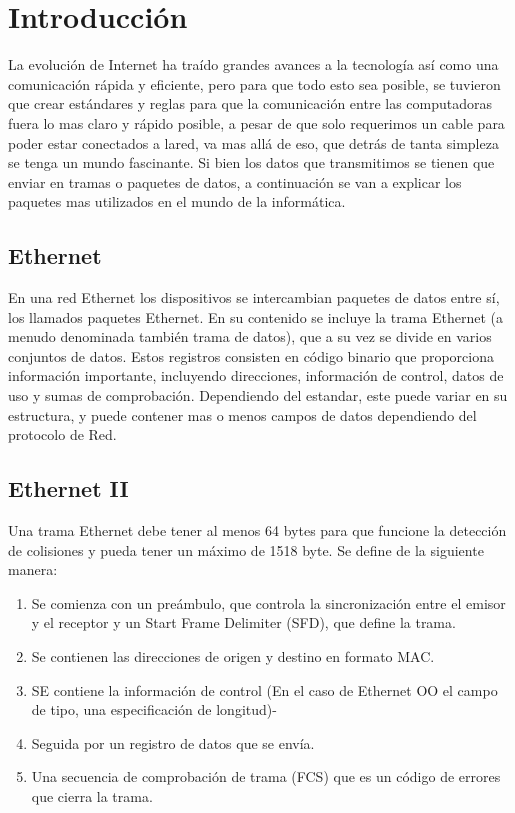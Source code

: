 \documentclass[12pt]{report}
\begin{document}
	\section*{Introducción}
	
	La evolución de Internet ha traído grandes avances a la tecnología así como una comunicación rápida y eficiente, pero para que todo esto sea posible, se tuvieron que crear estándares y reglas para que la comunicación entre las computadoras fuera lo mas claro y rápido posible, a pesar de que solo requerimos un cable para poder estar conectados a lared, va mas allá de eso, que detrás de tanta simpleza se tenga un mundo fascinante. Si bien los datos que transmitimos se tienen que enviar en tramas o paquetes de datos, a continuación se van a explicar los paquetes mas utilizados en el mundo de la informática.
	
	\subsection*{Ethernet}
	En una red Ethernet los dispositivos se intercambian paquetes de datos entre sí, los llamados paquetes Ethernet. En su contenido se incluye la trama Ethernet (a menudo denominada también trama de datos), que a su vez se divide en varios conjuntos de datos. Estos registros consisten en código binario que proporciona información importante, incluyendo direcciones, información de control, datos de uso y sumas de comprobación. Dependiendo del estandar, este puede variar en su estructura, y puede contener mas o menos campos de datos dependiendo del protocolo de Red.
	
	\subsection*{Ethernet II}
	
	Una trama Ethernet debe tener al menos 64 bytes para que funcione la detección de colisiones y pueda tener un máximo de 1518 byte. Se define de la siguiente manera:
	
	\begin{enumerate}
		\item Se comienza con un preámbulo, que controla la sincronización entre el emisor y el receptor y un Start Frame Delimiter (SFD), que define la trama.
		\item Se contienen las direcciones de origen y destino en formato MAC.
		\item SE contiene la información de control (En el caso de Ethernet OO el campo de tipo, una especificación de longitud)-
		\item Seguida por un registro de datos que se envía.
		\item Una secuencia de comprobación de trama (FCS) que es un código de errores que cierra la trama.
	\end{enumerate}
\end{document}
